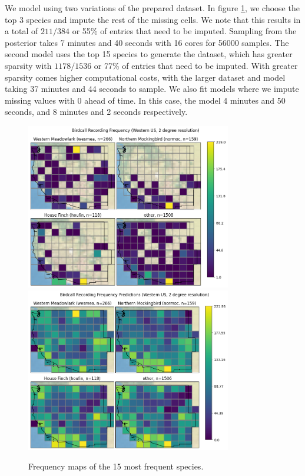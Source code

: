 \documentclass[notitlepage]{article}
\begin{document}
We model using two variations of the prepared dataset.
In figure \ref{fig:map_4}, we choose the top 3 species and impute the rest of the missing cells.
We note that this results in a total of $211/384$ or 55\% of entries that need to be imputed.
Sampling from the posterior takes 7 minutes and 40 seconds with 16 cores for 56000 samples.
The second model uses the top 15 species to generate the dataset, which has greater sparsity with $1178/1536$ or 77\% of entries that need to be imputed.
With greater sparsity comes higher computational costs, with the larger dataset and model taking 37 minutes and 44 seconds to sample.
We also fit models where we impute missing values with 0 ahead of time.
In this case, the model 4 minutes and 50 seconds, and 8 minutes and 2 seconds respectively.

\begin{figure}[H]
\centering
\includegraphics[width=0.8\textwidth]{report/figures/western_us_raw_4.png}
\includegraphics[width=0.8\textwidth]{report/figures/western_us_predict_4.png}
\caption{Frequency maps of the 15 most frequent species.}
\label{fig:map_4}
\end{figure}
\end{document}
